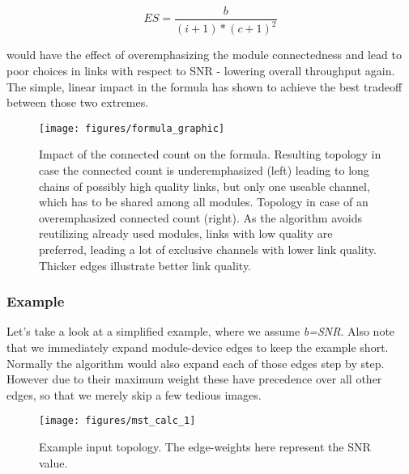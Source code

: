 	\begin{equation}
	  ES=\frac{b}{(i + 1)* (c + 1)^2}
	\end{equation}
	
	would have the effect of overemphasizing the module connectedness and lead to poor choices in links with respect to \ac{SNR} - 
	lowering overall throughput again. The simple, linear impact in the formula has shown to achieve the best tradeoff between those two extremes.
	
	\begin{figure}[h!]
	  \centering
	  \texttt{[image: figures/formula\_graphic]}
	  \caption{Impact of the connected count on the formula. Resulting topology in case the connected count is underemphasized (left) leading
	    to long chains of possibly high quality links, but only one useable channel, which has to be shared among all modules.
	    Topology in case of an overemphasized connected count (right). As the algorithm avoids reutilizing already used modules,
	    links with low quality are preferred, leading a lot of exclusive channels with lower link quality. Thicker edges illustrate better link quality.}
	  \label{fig:formula_graphic}
	\end{figure}

\newpage
	
      \subsubsection{Example}
	Let's take a look at a simplified example, where we assume \textit{b=SNR}. Also note that we immediately expand module-device edges to keep the example short.
	Normally the algorithm would also expand each of those edges step by step. However due to their maximum weight these have precedence over all other edges, 
	so that we merely skip a few tedious images.
	\begin{figure}[h!]
	  \centering
	  \begin{minipage}{0.5\textwidth}
	    \texttt{[image: figures/mst\_calc\_1]}
	  \end{minipage}
	  \caption{Example input topology. The edge-weights here represent the SNR value.}
	  \label{fig:mst_calc_initial}
	\end{figure}
	
